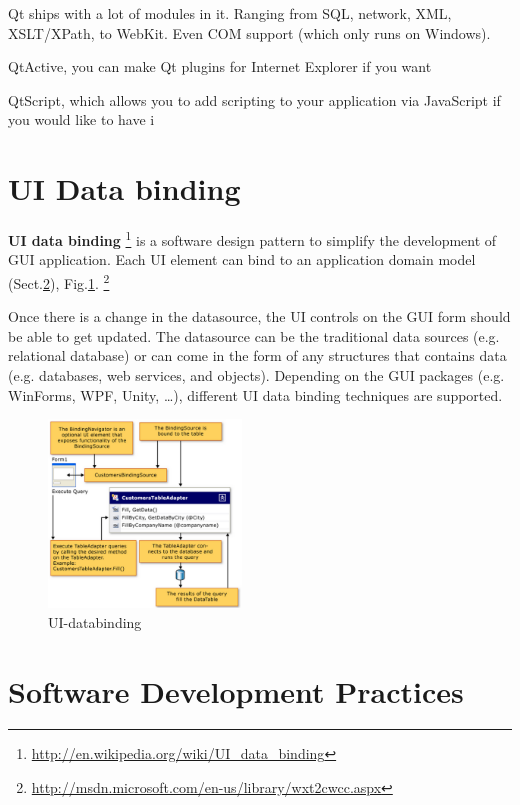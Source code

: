 Qt ships with a lot of modules in it. Ranging from SQL, network, XML,
XSLT/XPath, to WebKit. Even COM support (which only runs on Windows).

 QtActive, you can make Qt plugins for Internet Explorer if you want
 
  QtScript, which allows you to add scripting to your application via JavaScript if you would like to have i


  
\section{UI Data binding}
\label{sec:data-binding-UI}


{\bf UI data binding}
\footnote{\url{http://en.wikipedia.org/wiki/UI_data_binding}} is a software
design pattern to simplify the development of GUI application. Each UI element
can bind to an application domain model
(Sect.\ref{sec:software-dev-practices}), Fig.\ref{fig:UI-databinding}.
\footnote{\url{http://msdn.microsoft.com/en-us/library/wxt2cwcc.aspx}}

Once there is a change in the datasource, the UI controls on the GUI form should
be able to get updated. The datasource can be the traditional data sources (e.g.
relational database) or can come in the form of any structures that contains
data (e.g. databases, web services, and objects). Depending on the GUI packages
(e.g. WinForms, WPF, Unity, \ldots), different UI data binding techniques are
supported.


\begin{figure}[hbt]
  \centerline{\includegraphics[height=5cm,
    angle=0]{./images/UI-databinding.eps}}
  \caption{UI-databinding}
\label{fig:UI-databinding}
\end{figure}


\section{Software Development Practices}
\label{sec:software-dev-practices}


